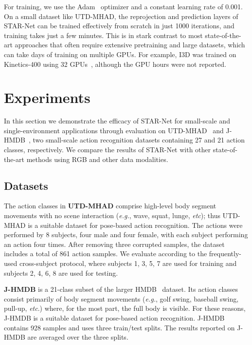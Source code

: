 \documentclass[10pt, conference, compsocconf]{IEEEtran}
\begin{document}
For training, we use the Adam~\cite{kingma2014adam} optimizer and a constant learning rate of 0.001. On a small dataset like UTD-MHAD, the reprojection and prediction layers of STAR-Net can be trained effectively from scratch in just 1000 iterations, and training takes just a few minutes. This is in stark contrast to most state-of-the-art approaches that often require extensive pretraining and large datasets, which can take days of training on multiple GPUs. For example, I3D was trained on Kinetics-400 using 32 GPUs~\cite{carreira2017quo}, although the GPU hours were not reported. 

\section{Experiments}
\label{sec:exp}

In this section we demonstrate the efficacy of STAR-Net for small-scale and single-environment applications through evaluation on UTD-MHAD~\cite{chen2015utd} and J-HMDB~\cite{jhuang2013towards}, two small-scale action recognition datasets containing 27 and 21 action classes, respectively. We compare the results of STAR-Net with other state-of-the-art methods using RGB and other data modalities. 



\subsection{Datasets}

The action classes in \textbf{UTD-MHAD} comprise high-level body segment movements with no scene interaction (\textit{e.g.}, wave, squat, lunge, \textit{etc}); thus UTD-MHAD is a suitable dataset for pose-based action recognition. The actions were performed by 8 subjects, four male and four female, with each subject performing an action four times. After removing three corrupted samples, the dataset includes a total of 861 action samples. We evaluate according to the frequently-used cross-subject protocol, where subjects 1, 3, 5, 7 are used for training and subjects 2, 4, 6, 8 are used for testing. 

\textbf{J-HMDB} is a 21-class subset of the larger HMDB~\cite{kuehne2011hmdb} dataset. Its action classes consist primarily of body segment movements (\textit{e.g.}, golf swing, baseball swing, pull-up, \textit{etc}.) where, for the most part, the full body is visible. For these reasons, J-HMDB is a suitable dataset for pose-based action recognition. J-HMDB contains 928 samples and uses three train/test splits. The results reported on J-HMDB are averaged over the three splits. 
\end{document}
